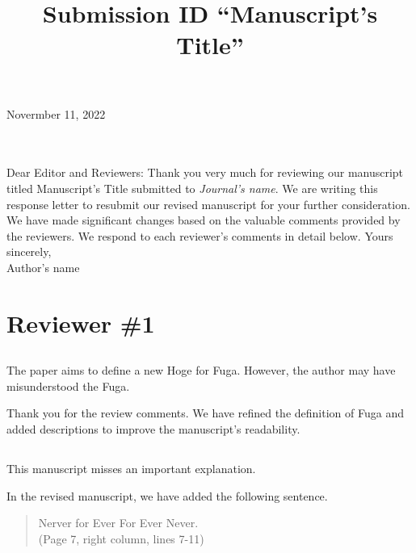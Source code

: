 \documentclass{ar2rc}
\title{Submission ID ``Manuscript's Title''}
\begin{document}
Novermber 11, 2022\\
\\
\\
\maketitle
{}\baselineskip
Dear Editor and Reviewers: 
\baselineskip
Thank you very much for reviewing our manuscript titled Manuscript's Title submitted to {\it Journal's name}. 
We are writing this response letter to resubmit our revised manuscript for your further consideration. 
We have made significant changes based on the valuable comments provided by the reviewers.
We respond to each reviewer's comments in detail below.
\baselineskip
Yours sincerely, \\ 
Author's name
\clearpage

\section{Reviewer \#1}
\subsection{}
\RC  The paper aims to define a new Hoge for Fuga. However, the author may have misunderstood the Fuga. 

\AR Thank you for the review comments. We have refined the definition of Fuga and added descriptions to improve the manuscript's readability.


\subsection{}
\RC  This manuscript misses an important explanation. 

\AR In the revised manuscript, we have added the following sentence. 
\begin{quote}
 Nerver for Ever For Ever Never.\\ 
(Page 7, right column, lines 7-11)
\end{quote}
\end{document}
